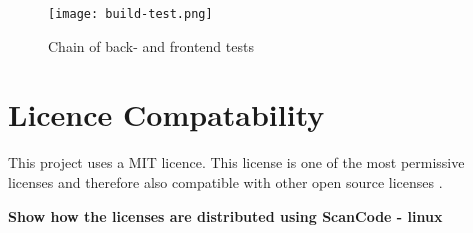 \begin{figure}[H]
    \centering
    \texttt{[image: build-test.png]}
    \caption{Chain of back- and frontend tests}
    \label{fig:tests}
\end{figure}

\section{Licence Compatability}
This project uses a MIT licence. This license is one of the most permissive licenses and therefore also compatible with other open source licenses \cite{wheeler:floss-license-slide}. 

\textbf{Show how the licenses are distributed using ScanCode - linux}




